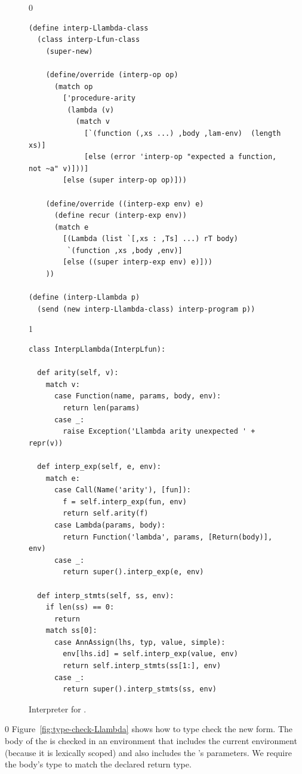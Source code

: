 \documentclass[7x10]{TimesAPriori_MIT}%
\def\racketEd{0}
\def\pythonEd{1}
\def\edition{0}
\numberwithin{theorem}{chapter}
\numberwithin{definition}{chapter}
\numberwithin{equation}{chapter}
\begin{document}
\begin{figure}[tbp]
  \begin{tcolorbox}[colback=white]
    {\if\edition\racketEd 
\begin{lstlisting}
(define interp-Llambda-class
  (class interp-Lfun-class
    (super-new)

    (define/override (interp-op op)
      (match op
        ['procedure-arity
         (lambda (v)
           (match v
             [`(function (,xs ...) ,body ,lam-env)  (length xs)]
             [else (error 'interp-op "expected a function, not ~a" v)]))]
        [else (super interp-op op)]))

    (define/override ((interp-exp env) e)
      (define recur (interp-exp env))
      (match e
        [(Lambda (list `[,xs : ,Ts] ...) rT body)
         `(function ,xs ,body ,env)]
        [else ((super interp-exp env) e)]))
    ))

(define (interp-Llambda p)
  (send (new interp-Llambda-class) interp-program p))
\end{lstlisting}
\fi}
{\if\edition\pythonEd
\begin{lstlisting}
class InterpLlambda(InterpLfun):

  def arity(self, v):
    match v:
      case Function(name, params, body, env):
        return len(params)
      case _:
        raise Exception('Llambda arity unexpected ' + repr(v))
      
  def interp_exp(self, e, env):
    match e:
      case Call(Name('arity'), [fun]):
        f = self.interp_exp(fun, env)
        return self.arity(f)
      case Lambda(params, body):
        return Function('lambda', params, [Return(body)], env)
      case _:
        return super().interp_exp(e, env)
    
  def interp_stmts(self, ss, env):
    if len(ss) == 0:
      return
    match ss[0]:
      case AnnAssign(lhs, typ, value, simple):
        env[lhs.id] = self.interp_exp(value, env)
        return self.interp_stmts(ss[1:], env)
      case _:
        return super().interp_stmts(ss, env)
\end{lstlisting}
\fi}
  \end{tcolorbox}

  \caption{Interpreter for \LangLam{}.}
\label{fig:interp-Llambda}
\end{figure}


\label{sec:type-check-r5}

{\if\edition\racketEd
%
Figure~\ref{fig:type-check-Llambda} shows how to type check the new
 form. The body of the  is checked in an
environment that includes the current environment (because it is
lexically scoped) and also includes the 's parameters.  We
require the body's type to match the declared return type.
%
\fi}
\end{document}
